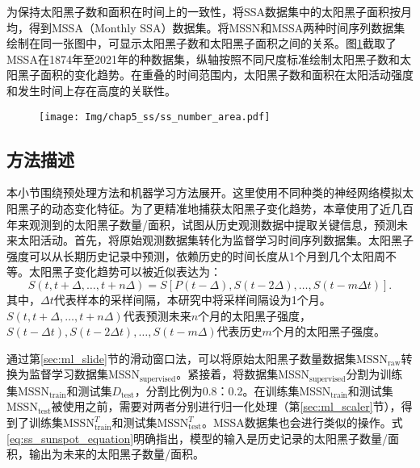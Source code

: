 为保持太阳黑子数和面积在时间上的一致性，将SSA数据集中的太阳黑子面积按月均，得到MSSA（Monthly SSA）数据集。将MSSN和MSSA两种时间序列数据集绘制在同一张图中，可显示太阳黑子数和太阳黑子面积之间的关系。图\ref{fig:ss_number_area}截取了MSSA在1874年至2021年的种数据集，纵轴按照不同尺度标准绘制太阳黑子数和太阳黑子面积的变化趋势。在重叠的时间范围内，太阳黑子数和面积在太阳活动强度和发生时间上存在高度的关联性。

\begin{figure}[!htbp]
  \vspace{-0.3cm}
  \centering
  \texttt{[image: Img/chap5\_ss/ss\_number\_area.pdf]}
  \vspace{-1.4cm}
  \label{fig:ss_number_area}
\end{figure}

\subsection{方法描述}\label{subsec:ss_method}

本小节围绕预处理方法和机器学习方法展开。这里使用不同种类的神经网络模拟太阳黑子的动态变化特征。为了更精准地捕获太阳黑子变化趋势，本章使用了近几百年来观测到的太阳黑子数量/面积，试图从历史观测数据中提取关键信息，预测未来太阳活动。首先，将原始观测数据集转化为监督学习时间序列数据集。太阳黑子强度可以从长期历史记录中预测，依赖历史的时间长度从1个月到几个太阳周不等。太阳黑子变化趋势可以被近似表达为：
\begin{equation}
  \label{eq:ss_sunspot_equation}
  S(t,t+\Delta,\ldots,t+n\Delta)=S[P(t-\Delta),S(t-2\Delta),\ldots,S(t-m\Delta t)].
\end{equation}
其中，$\Delta t$代表样本的采样间隔，本研究中将采样间隔设为1个月。$S(t,t+\Delta,\ldots,t+n\Delta)$代表预测未来$n$个月的太阳黑子强度，$S(t-\Delta t),S(t-2\Delta t),\ldots,S(t-m\Delta)$代表历史$m$个月的太阳黑子强度。

通过第\ref{sec:ml_slide}节的滑动窗口法，可以将原始太阳黑子数量数据集$\text{MSSN}_{\text{raw}}$转换为监督学习数据集$\text{MSSN}_{\text{supervised}}$。紧接着，将数据集$\text{MSSN}_{\text{supervised}}$分割为训练集$\text{MSSN}_{\text{train}}$和测试集$D_{\text{test}}$，分割比例为0.8：0.2。在训练集$\text{MSSN}_{\text{train}}$和测试集$\text{MSSN}_{\text{test}}$被使用之前，需要对两者分别进行归一化处理（第\ref{sec:ml_scaler}节），得到了训练集$\text{MSSN}^T_{\text{train}}$和测试集$\text{MSSN}^T_{\text{test}}$。MSSA数据集也会进行类似的操作。式\ref{eq:ss_sunspot_equation}明确指出，模型的输入是历史记录的太阳黑子数量/面积，输出为未来的太阳黑子数量/面积。

